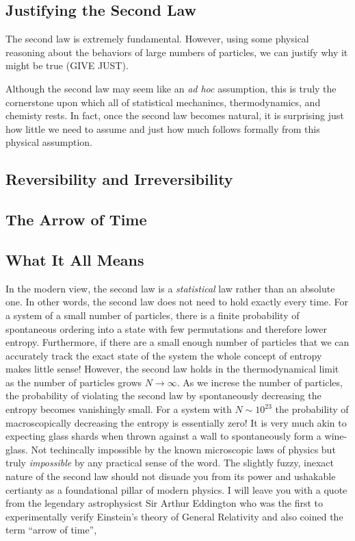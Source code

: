 \documentclass[11pt,a4paper]{article}
\theoremstyle{theorem}
\theoremstyle{definition}
\theoremstyle{definition}
\theoremstyle{remark}
\theoremstyle{definition}
\theoremstyle{remark}
\begin{document}
\subsection{Justifying the Second Law}

The second law is extremely fundamental. However, using some physical reasoning about the behaviors of large numbers of particles, we can justify why it might be true (GIVE JUST).

Although the second law  may seem like an \textit{ad hoc} assumption, this is truly the cornerstone upon which all of statistical mechanincs, thermodynamics, and chemisty rests. In fact, once  the second law becomes natural, it is surprising just how little we need to assume and just how much follows formally from this physical assumption. 

\subsection{Reversibility and Irreversibility}

\subsection{The Arrow of Time}

\subsection{What It All Means}

In the modern view, the second law is a \textit{statistical} law rather than an absolute one. In other words, the second law does not need to hold exactly every time. For a system of a small number of particles, there is a finite probability of spontaneous ordering into a state with few permutations and therefore lower entropy. Furthermore, if there are a small enough number of particles that we can accurately track the exact state of the system the whole concept of entropy makes little sense! However, the second law holds in the thermodynamical limit as the number of particles grows $N \to \infty$. As we increse the number of particles, the probability of violating the second law by spontaneously decreasing the entropy becomes vanishingly small. For a system with $N \sim 10^{23}$ the probability of macroscopically decreasing the entropy is essentially zero! It is very much akin to expecting glass shards when thrown against a wall to spontaneously form a wine-glass. Not techincally impossible by the known microscopic laws of physics but truly \textit{impossible} by any practical sense of the word. The slightly fuzzy, inexact nature of the second law should not disuade you from its power and ushakable certianty as a foundational pillar of modern physics. I will leave you with a quote from the legendary astrophysicst Sir Arthur Eddington who was the first to experimentally verify Einstein's theory of General Relativity and also coined the term ``arrow of time'', 
\end{document}
